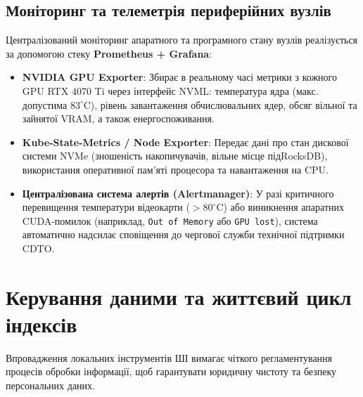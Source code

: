 \documentclass{article}
\begin{document}
\subsection{Моніторинг та телеметрія периферійних вузлів}
Централізований моніторинг апаратного та програмного стану вузлів реалізується за допомогою стеку \textbf{Prometheus + Grafana}:
\begin{itemize}
\item \textbf{NVIDIA GPU Exporter}: Збирає в реальному часі метрики з кожного GPU RTX 4070 Ti через інтерфейс NVML: температура ядра (макс. допустима $83^\circ\text{C}$), рівень завантаження обчислювальних ядер, обсяг вільної та зайнятої VRAM, а також енергоспоживання.
\item \textbf{Kube-State-Metrics / Node Exporter}: Передає дані про стан дискової системи NVMe (зношеність накопичувачів, вільне місце підRocksDB), використання оперативної пам'яті процесора та навантаження на CPU.
\item \textbf{Централізована система алертів (Alertmanager)}: У разі критичного перевищення температури відеокарти ($>80^\circ\text{C}$) або виникнення апаратних CUDA-помилок (наприклад, \texttt{Out of Memory} або \texttt{GPU lost}), система автоматично надсилає сповіщення до чергової служби технічної підтримки CDTO.
\end{itemize}

\section{Керування даними та життєвий цикл індексів}
Впровадження локальних інструментів ШІ вимагає чіткого регламентування процесів обробки інформації, щоб гарантувати юридичну чистоту та безпеку персональних даних.
\end{document}
